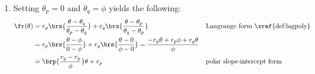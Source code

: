 \begin{enumerate}
    \item Setting $\theta_p=0$ and $\theta_q=\phi$ yields the following:
      \begin{align*}
        \fr(\theta) 
          &= r_p\brs{\frac{\theta-\theta_q}{\theta_p-\theta_q}} + r_q\brs{\frac{\theta-\theta_p}{\theta_q-\theta_p}}
          && \text{Langrange form \xref{def:lagpoly}}
        \\&= r_p\brs{\frac{\theta-\phi}{0-\phi}} + r_q\brs{\frac{\theta-0}{\phi-0}}
           = \frac{-r_p\theta + r_p\phi + r_q\theta}{\phi}
        \\&= \brp{\frac{r_q-r_p}{\phi}}\theta + r_p
          && \text{polar slope-intercept form}
      \end{align*}


\end{enumerate}



